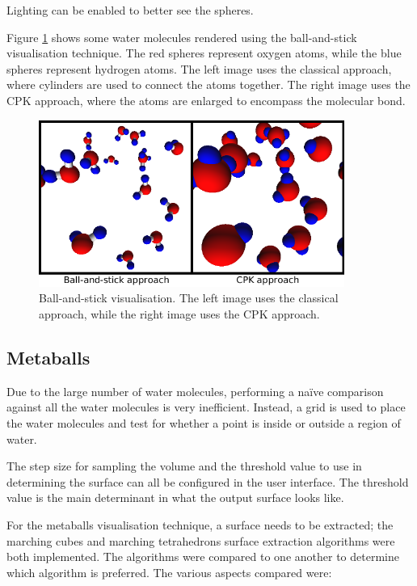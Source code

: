 Lighting can be enabled to better see the spheres.

Figure \ref{fig:implementation_ballstick} shows some water molecules rendered
using the ball-and-stick visualisation technique. The red spheres represent
oxygen atoms, while the blue spheres represent hydrogen atoms. The
left image uses the classical approach, where cylinders are used to connect the
atoms together. The right image uses the CPK approach, where the atoms are
enlarged to encompass the molecular bond.

\begin{figure}
  \begin{center}
    \includegraphics[width=100mm]{ballstick}
  \end{center}
  \caption{Ball-and-stick visualisation. The left image uses the classical
  approach, while the right image uses the CPK approach.}
  \label{fig:implementation_ballstick}
\end{figure}


\subsection*{Metaballs}

Due to the large number of water molecules, performing a na\"ive comparison
against all the water molecules is very inefficient. Instead, a grid is used to
place the water molecules and test for whether a point is inside or outside a
region of water.

The step size for sampling the volume and the threshold value to use in
determining the surface can all be configured in the user interface. The
threshold value is the main determinant in what the output surface looks like.


For the metaballs visualisation technique, a surface needs to be extracted; the
marching cubes and marching tetrahedrons surface extraction algorithms were
both implemented. The algorithms were compared to one another to determine
which algorithm is preferred. The various aspects compared were:

